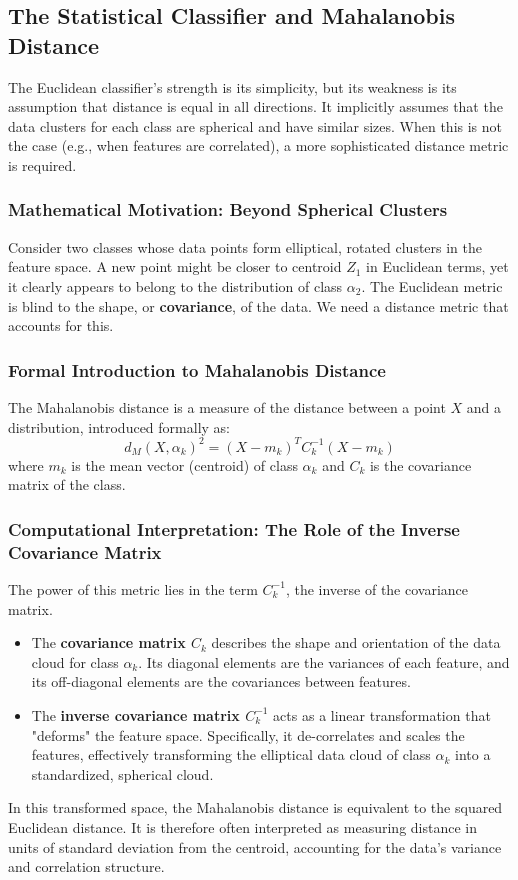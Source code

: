 \subsection*{The Statistical Classifier and Mahalanobis Distance}
The Euclidean classifier's strength is its simplicity, but its weakness is its assumption that distance is equal in all directions. It implicitly assumes that the data clusters for each class are spherical and have similar sizes. When this is not the case (e.g., when features are correlated), a more sophisticated distance metric is required.

\subsubsection*{Mathematical Motivation: Beyond Spherical Clusters}
Consider two classes whose data points form elliptical, rotated clusters in the feature space. A new point might be closer to centroid $Z_1$ in Euclidean terms, yet it clearly appears to belong to the distribution of class $\alpha_2$. The Euclidean metric is blind to the shape, or \textbf{covariance}, of the data. We need a distance metric that accounts for this.

\subsubsection*{Formal Introduction to Mahalanobis Distance}
The Mahalanobis distance is a measure of the distance between a point $X$ and a distribution, introduced formally as:
$$ d_M(X, \alpha_k)^2 = (X - m_k)^T C_k^{-1} (X - m_k) $$
where $m_k$ is the mean vector (centroid) of class $\alpha_k$ and $C_k$ is the covariance matrix of the class.

\subsubsection*{Computational Interpretation: The Role of the Inverse Covariance Matrix}
The power of this metric lies in the term $C_k^{-1}$, the inverse of the covariance matrix.
\begin{itemize}
    \item The \textbf{covariance matrix $C_k$} describes the shape and orientation of the data cloud for class $\alpha_k$. Its diagonal elements are the variances of each feature, and its off-diagonal elements are the covariances between features.
    \item The \textbf{inverse covariance matrix $C_k^{-1}$} acts as a linear transformation that "deforms" the feature space. Specifically, it de-correlates and scales the features, effectively transforming the elliptical data cloud of class $\alpha_k$ into a standardized, spherical cloud.
\end{itemize}
In this transformed space, the Mahalanobis distance is equivalent to the squared Euclidean distance. It is therefore often interpreted as measuring distance in units of standard deviation from the centroid, accounting for the data's variance and correlation structure.


